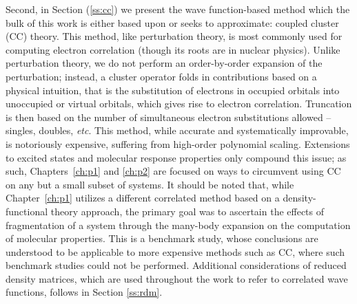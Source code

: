 Second, in Section (\ref{ss:cc}) we present the wave
function-based method which the bulk of this work is either
based upon or seeks to approximate: coupled cluster (CC) theory.
\cite{Sinanoglu1964,Cizek1966,Cizek1969,Crawford2000} This method,
like perturbation theory, is most commonly used for computing electron
correlation (though its roots are in nuclear physics).  Unlike perturbation
theory, we do not perform an order-by-order expansion of the perturbation;
instead, a cluster operator folds in contributions based on a physical
intuition, 
that is the substitution of electrons in occupied orbitals into
unoccupied or virtual orbitals,
which gives rise to electron correlation. 
Truncation is then based on the
number of simultaneous electron substitutions allowed -- singles, doubles, \textit{etc}.
This
method, while accurate and systematically improvable, is notoriously
expensive, suffering from high-order polynomial scaling. Extensions to
excited states and molecular response properties only compound this issue;
\cite{Hoodbhoy1979,Crawford2006,Helgaker2012,Crawford2019} as such, Chapters~\ref{ch:p1}
and \ref{ch:p2} are focused on ways to circumvent using CC on any but a small
subset of systems. It should be noted that, while Chapter~\ref{ch:p1} utilizes a
different correlated method based on a density-functional theory approach,
the primary goal was to ascertain the effects of fragmentation of a system
through the many-body expansion on the computation of molecular properties.
This is a benchmark study, whose conclusions are understood to be applicable
to more expensive methods such as CC, where such benchmark studies could
not be performed.  Additional considerations of reduced density matrices,
\cite{RDM1976,Harris1992,pinkbook} which are used throughout the work to
refer to correlated wave functions, follows in Section \ref{ss:rdm}.

